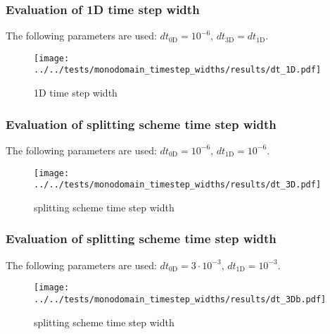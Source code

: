 \subsubsection{Evaluation of 1D time step width}
\vspace*{-0.2cm}
The following parameters are used: $dt_\text{0D}= 10^{-6}$, $dt_\text{3D} = dt_\text{1D}$.
\begin{figure}[h!]
  \centering%
  \texttt{[image: ../../tests/monodomain\_timestep\_widths/results/dt\_1D.pdf]}%
  \caption{1D time step width}
\end{figure} 

\subsubsection{Evaluation of splitting scheme time step width}
\vspace*{-0.2cm}
The following parameters are used: $dt_\text{0D} = 10^{-6}$, $dt_\text{1D}= 10^{-6}$.
\begin{figure}[h!]
  \centering%
  \texttt{[image: ../../tests/monodomain\_timestep\_widths/results/dt\_3D.pdf]}%
  \caption{splitting scheme time step width}
\end{figure} 

\subsubsection{Evaluation of splitting scheme time step width}
\vspace*{-0.2cm}
The following parameters are used: $dt_\text{0D}= 3\cdot 10^{-3}$, $dt_\text{1D} = 10^{-3}$.
\begin{figure}[h!]
  \centering%
  \texttt{[image: ../../tests/monodomain\_timestep\_widths/results/dt\_3Db.pdf]}%
  \caption{splitting scheme time step width}
\end{figure} 


%
